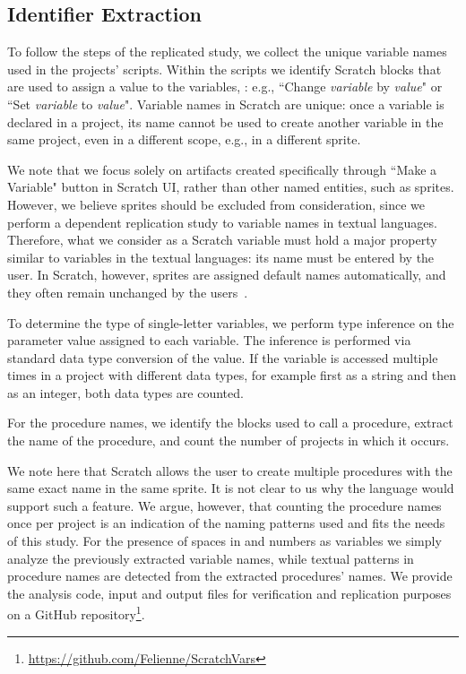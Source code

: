 \documentclass[conference]{IEEEtran}
\begin{document}
\subsection{Identifier Extraction}
To follow the steps of the replicated study, we collect the unique variable names used in the projects' scripts. 
Within the scripts we identify Scratch blocks that are used to assign a value to the variables, : e.g., ``Change \textit{variable} by \textit{value}" or ``Set \textit{variable} to \textit{value}". 
Variable names in Scratch are unique: once a variable is declared in a project, its name cannot be used to create another variable in the same project, even in a different scope, e.g., in a different sprite.  

We note that we focus solely on artifacts created specifically through ``Make a Variable" button in Scratch UI, rather than other named entities, such as sprites. However, we believe sprites should be excluded from consideration, since we perform a dependent replication study to variable names in textual languages. Therefore, what we consider as a Scratch variable must hold a major property similar to variables in the textual languages: its name must be entered by the user. In Scratch, however, sprites are assigned default names automatically, and they often remain unchanged by the users~\cite{MoreonoRobles}.

To determine the type of single-letter variables, we perform type inference on the parameter value assigned to each variable. 
The inference is performed via standard data type conversion of the value.
If the variable is accessed multiple times in a project with different data types, for example first as a string and then as an integer, both data types are counted.

For the procedure names, we identify the blocks used to call a procedure, extract the name of the procedure, and count the number of projects in which it occurs. 

We note here that Scratch allows the user to create multiple procedures with the same exact name in the same sprite. It is not clear to us why the language would support such a feature. We argue, however, that counting the procedure names once per project is an indication of the naming patterns used and fits the needs of this study. For the presence of spaces in and numbers as variables we simply analyze the previously extracted variable names, while textual patterns in procedure names are detected from the extracted procedures' names.
We provide the analysis code, input and output files for verification and replication purposes on a GitHub repository\footnote{\url{https://github.com/Felienne/ScratchVars}}.
\end{document}
